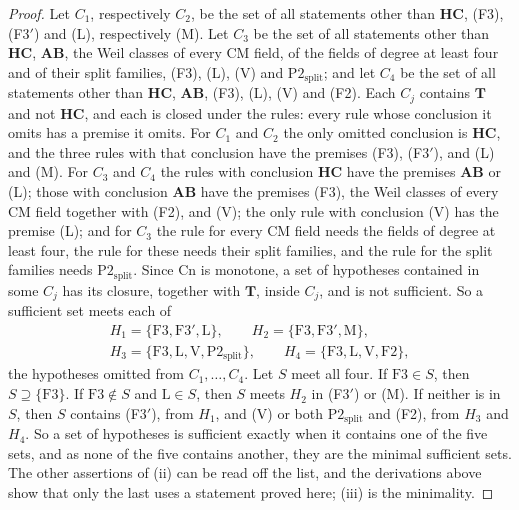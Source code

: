 \documentclass[11pt,reqno]{amsart}
\theoremstyle{plain}
\theoremstyle{definition}
\theoremstyle{remark}
\newcommand{\Cn}{\mathrm{Cn}}
\begin{document}
\begin{proof}
Let $C_{1}$, respectively $C_{2}$, be the set of all statements other than
$\mathbf{HC}$, (F3), (F3$'$) and (L), respectively (M). Let $C_{3}$ be the
set of all statements other than $\mathbf{HC}$, $\mathbf{AB}$, the Weil
classes of every CM field, of the fields of degree at least four and of their
split families, (F3), (L), (V) and $\mathrm{P2}_{\mathrm{split}}$; and let
$C_{4}$ be the set of all statements other than $\mathbf{HC}$,
$\mathbf{AB}$, (F3), (L), (V) and (F2). Each $C_{j}$ contains $\mathbf{T}$
and not $\mathbf{HC}$, and each is closed under the rules: every rule whose
conclusion it omits has a premise it omits. For $C_{1}$ and $C_{2}$ the only
omitted conclusion is $\mathbf{HC}$, and the three rules with that
conclusion have the premises (F3), (F3$'$), and (L) and (M). For $C_{3}$
and $C_{4}$ the rules with conclusion $\mathbf{HC}$ have the premises
$\mathbf{AB}$ or (L); those with conclusion $\mathbf{AB}$ have the premises
(F3), the Weil classes of every CM field together with (F2), and (V); the
only rule with conclusion (V) has the premise (L); and for $C_{3}$ the rule
for every CM field needs the fields of degree at least four, the rule for
these needs their split families, and the rule for the split families needs
$\mathrm{P2}_{\mathrm{split}}$. Since $\Cn$ is monotone, a set of
hypotheses contained in some $C_{j}$ has its closure, together with
$\mathbf{T}$, inside $C_{j}$, and is not sufficient. So a sufficient set
meets each of
\begin{gather*}
  H_{1}=\{\mathrm{F3},\mathrm{F3}',\mathrm{L}\},\qquad
  H_{2}=\{\mathrm{F3},\mathrm{F3}',\mathrm{M}\},\\
  H_{3}=\{\mathrm{F3},\mathrm{L},\mathrm{V},\mathrm{P2}_{\mathrm{split}}\},\qquad
  H_{4}=\{\mathrm{F3},\mathrm{L},\mathrm{V},\mathrm{F2}\},
\end{gather*}
the hypotheses omitted from $C_{1},\dots,C_{4}$. Let $S$ meet all four. If
$\mathrm{F3}\in S$, then $S\supseteq\{\mathrm{F3}\}$. If $\mathrm{F3}\notin S$
and $\mathrm{L}\in S$, then $S$ meets $H_{2}$ in (F3$'$) or (M). If neither is
in $S$, then $S$ contains (F3$'$), from $H_{1}$, and (V) or both
$\mathrm{P2}_{\mathrm{split}}$ and (F2), from $H_{3}$ and $H_{4}$. So a set
of hypotheses is sufficient exactly when it contains one of the five sets,
and as none of the five contains another, they are the minimal sufficient
sets. The other assertions of (ii) can be read off the list, and the
derivations above show that only the last uses a statement proved here;
(iii) is the minimality.


\end{proof}
\end{document}
